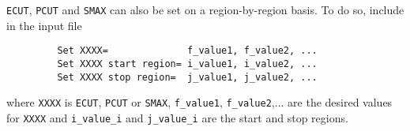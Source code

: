 \verb+ECUT+, \verb+PCUT+ and \verb+SMAX+ can also be set on a 
region-by-region basis. To do so, include in the input file
\begin{verbatim}
         Set XXXX=              f_value1, f_value2, ...
         Set XXXX start region= i_value1, i_value2, ...
         Set XXXX stop region=  j_value1, j_value2, ...
\end{verbatim}
where \verb+XXXX+ is \verb+ECUT+, \verb+PCUT+ or \verb+SMAX+, 
\verb+f_value1+, \verb+f_value2+,... 
are the desired values for \verb+XXXX+ and \verb+i_value_i+ and 
\verb+j_value_i+ are the start and stop regions.

